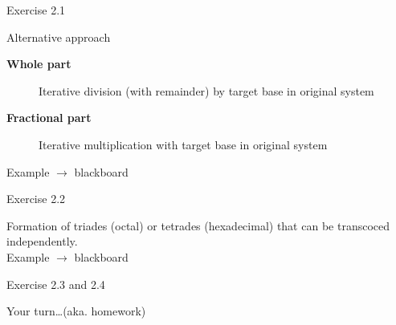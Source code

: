 \documentclass[11pt]{tudbeamer}
\begin{document}
\begin{frame}[allowframebreaks]{Exercise 2.1}
\framebreak

	\begin{block}{Alternative approach}
		\begin{description}
			\item[\textbf{Whole part}] Iterative division (with remainder) by target base in original system
			\item[\textbf{Fractional part}] Iterative multiplication with target base in original system
		\end{description}
	\end{block}
	
	Example $\rightarrow$ blackboard

\end{frame}

\begin{frame}{Exercise 2.2}

	Formation of triades (octal) or tetrades (hexadecimal) that can be transcoced independently.\\
	Example $\rightarrow$ blackboard

\end{frame}

\begin{frame}{Exercise 2.3 and 2.4}
	\centering
	
	Your turn\dots (aka. homework)

\end{frame}
\end{document}
